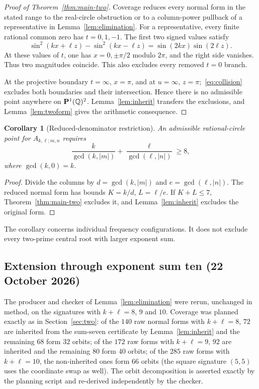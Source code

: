 \documentclass[11pt,letterpaper]{article}
\newtheorem{corollary}[theorem]{Corollary}
\theoremstyle{definition}\newtheorem{definition}[theorem]{Definition}
\theoremstyle{remark}\newtheorem{remark}[theorem]{Remark}
\newcommand{\Q}{\mathbb Q}\newcommand{\Z}{\mathbb Z}\newcommand{\R}{\mathbb R}
\begin{document}
\begin{proof}[Proof of Theorem~\ref{thm:main-two}]
Coverage reduces every normal form in the stated range to the real-circle obstruction or to a column-power pullback of a representative in Lemma~\ref{lem:elimination}. For a representative, every finite rational common zero has $t=0,1,-1$. The first two signed values satisfy
\begin{equation}\label{eq:collision}
 \sin^2(kx+\ell z)-\sin^2(kx-\ell z)
 =\sin(2kx)\sin(2\ell z).
\end{equation}
At these values of $t$, one has $x=0,\pm\pi/2$ modulo $2\pi$, and the right side vanishes. Thus two magnitudes coincide. This also excludes every removed $t=0$ branch.

At the projective boundary $t=\infty$, $x=\pi$, and at $u=\infty$, $z=\pi$;~\eqref{eq:collision} excludes both boundaries and their intersection. Hence there is no admissible point anywhere on $\PP(\Q)^2$. Lemma~\ref{lem:inherit} transfers the exclusions, and Lemma~\ref{lem:twoform} gives the arithmetic consequence.
\end{proof}

\begin{corollary}[Reduced-denominator restriction]\label{cor:denominator}
An admissible rational-circle point for $A_{k,\ell;m,n}$ requires
\[
 \frac{k}{\gcd(k,|m|)}+\frac{\ell}{\gcd(\ell,|n|)}\ge8,
\]
where $\gcd(k,0)=k$.
\end{corollary}
\begin{proof}
Divide the columns by $d=\gcd(k,|m|)$ and $e=\gcd(\ell,|n|)$. The reduced normal form has bounds $K=k/d$, $L=\ell/e$. If $K+L\le7$, Theorem~\ref{thm:main-two} excludes it, and Lemma~\ref{lem:inherit} excludes the original form.
\end{proof}
The corollary concerns individual frequency configurations. It does not exclude every two-prime central root with larger exponent sum.

\subsection{Extension through exponent sum ten (22 October 2026)}\label{sec:sumnine}
The producer and checker of Lemma~\ref{lem:elimination} were rerun, unchanged in method, on the signatures with $k+\ell=8$, $9$ and $10$. Coverage was planned exactly as in Section~\ref{sec:two}: of the $140$ raw normal forms with $k+\ell=8$, $72$ are inherited from the sum-seven certificate by Lemma~\ref{lem:inherit} and the remaining $68$ form $32$ orbits; of the $172$ raw forms with $k+\ell=9$, $92$ are inherited and the remaining $80$ form $40$ orbits; of the $285$ raw forms with $k+\ell=10$, the non-inherited ones form $66$ orbits (the square signature $(5,5)$ uses the coordinate swap as well). The orbit decomposition is asserted exactly by the planning script and re-derived independently by the checker.
\end{document}
